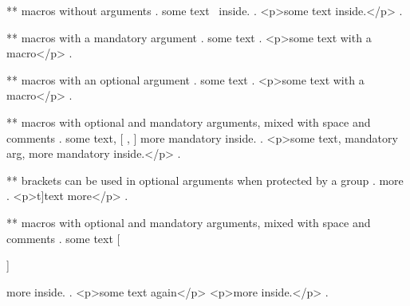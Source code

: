 ** macros without arguments
.
some text \echo\ inside.
.
<p>some text  inside.</p>
.

** macros with a mandatory argument
.
some text 
.
<p>some text with a macro</p>
.

** macros with an optional argument
.
some text 
.
<p>some text with a macro</p>
.


** macros with optional and mandatory arguments, mixed with space and comments
.
some text,  [%
,  %
 ]
 {more mandatory} inside.
.
<p>some text, mandatory arg, more mandatory inside.</p>
.


** brackets can be used in optional arguments when protected by a group
.
\echo[{t]}t]{ext} more
.
<p>t]text more</p>
.



** macros with optional and mandatory arguments, mixed with space and comments
.
some text  [%

 ]%

  {more} inside.
.
<p>some text again</p>
<p>more inside.</p>
.
